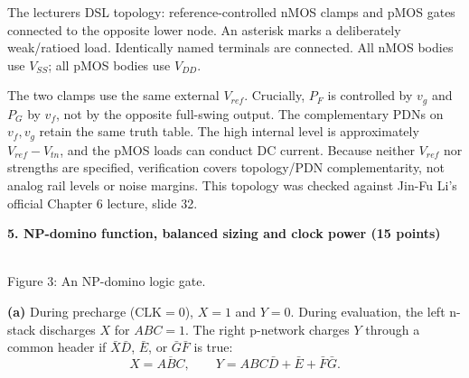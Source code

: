 \documentclass[10pt]{article}
\newcommand{\mos}[4]{\begin{scope}[shift={(#1,#2)}]
\draw (0,.24)--(0,-.24);\draw (0,.20)--(.25,.20)--(.25,.5);
\draw (0,-.20)--(.25,-.20)--(.25,-.5);\draw (-.16,.23)--(-.16,-.23);
\ifnum#4=1\draw (-.26,0) circle (.06);\draw (-.75,0)--(-.32,0);\else\draw (-.75,0)--(-.16,0);\fi
\node[anchor=east,font=\scriptsize] at (-.76,0) {$#3$};\end{scope}}
\newcommand{\ground}[2]{\draw (#1,#2)--(#1,{#2-.12});\draw ({#1-.17},{#2-.12})--({#1+.17},{#2-.12});\draw ({#1-.11},{#2-.20})--({#1+.11},{#2-.20});}
\newcommand{\rail}[3]{\draw (#1,#2)--(#1,{#2+.14});\node[above,font=\scriptsize] at (#1,{#2+.14}) {$#3$};}
\newcommand{\qheading}[1]{\par\medskip\textbf{#1}\par}
\begin{document}
\small The lecturer\textquotesingle s DSL topology: reference-controlled nMOS clamps and pMOS gates connected to the opposite lower node. An asterisk marks a deliberately weak/ratioed load. Identically named terminals are connected. All nMOS bodies use $V_{SS}$; all pMOS bodies use $V_{DD}$.\normalsize\par
The two clamps use the same external $V_{ref}$. Crucially, $P_F$ is controlled by $v_g$ and $P_G$ by $v_f$, not by the opposite full-swing output. The complementary PDNs on $v_f,v_g$ retain the same truth table. The high internal level is approximately $V_{ref}-V_{tn}$, and the pMOS loads can conduct DC current. Because neither $V_{ref}$ nor strengths are specified, verification covers topology/PDN complementarity, not analog rail levels or noise margins. This topology was checked against Jin-Fu Li's official Chapter 6 lecture, slide 32.
\newpage
\qheading{5. NP-domino function, balanced sizing and clock power (15 points)}
\begin{center}\\\small Figure 3: An NP-domino logic gate.\end{center}
\textbf{(a)} During precharge ($\mathrm{CLK}=0$), $X=1$ and $Y=0$. During evaluation, the left n-stack discharges $X$ for $ABC=1$. The right p-network charges $Y$ through a common header if $\bar X\bar D$, $\bar E$, or $\bar G\bar F$ is true:
\[\boxed{X=\overline{ABC},\qquad Y=ABC\bar D+\bar E+\bar F\bar G.}\]
\end{document}
